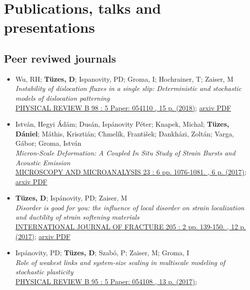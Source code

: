 \documentclass[10pt,USletter,sans]{moderncv}        %
\begin{document}
\section{Publications, talks and presentations}
\subsection{Peer reviwed journals}
\begin{itemize}
\item Wu, RH; \textbf{Tüzes, D}; Ispanovity, PD; Groma, I; Hochrainer, T; Zaiser, M\\
	\emph{Instability of dislocation fluxes in a single slip: Deterministic and stochastic models of dislocation patterning}\\
    \href{https://journals.aps.org/prb/abstract/10.1103/PhysRevB.98.054110}{PHYSICAL REVIEW B 98 : 5 Paper: 054110 , 15 p. (2018)};
    \href{https://arxiv.org/pdf/1708.05533}{arxiv PDF}
\item István, Hegyi Ádám; Dusán, Ispánovity Péter; Knapek, Michal; \textbf{Tüzes, Dániel}; Máthis, Krisztián; Chmelík, František; Dankházi, Zoltán; Varga, Gábor; Groma, István\\
    \emph{Micron-Scale Deformation: A Coupled In Situ Study of Strain Bursts and Acoustic Emission}\\
    \href{https://www.cambridge.org/core/journals/microscopy-and-microanalysis/article/micronscale-deformation-a-coupled-in-situ-study-of-strain-bursts-and-acoustic-emission/DAF84F7E4CC7C2A211E39A1FFBCCB2D0}{MICROSCOPY AND MICROANALYSIS 23 : 6 pp. 1076-1081. , 6 p. (2017)};
    \href{https://arxiv.org/pdf/1604.01815}{arxiv PDF}
\item \textbf{Tüzes, D}; Ispánovity, PD; Zaiser, M\\
    \emph{Disorder is good for you: the influence of local disorder on strain localization and ductility of strain softening materials}\\
    \href{https://link.springer.com/article/10.1007\%2Fs10704-017-0187-1}{INTERNATIONAL JOURNAL OF FRACTURE 205 : 2 pp. 139-150. , 12 p. (2017)};
    \href{https://arxiv.org/pdf/1604.01821}{arxiv PDF}
\item Ispánovity, PD; \textbf{Tüzes, D}; Szabó, P; Zaiser, M; Groma, I\\
    \emph{Role of weakest links and system-size scaling in multiscale modeling of stochastic plasticity}\\
    \href{https://journals.aps.org/prb/abstract/10.1103/PhysRevB.95.054108}{PHYSICAL REVIEW B 95 : 5 Paper: 054108 , 13 p. (2017)};

\end{itemize}
\end{document}
